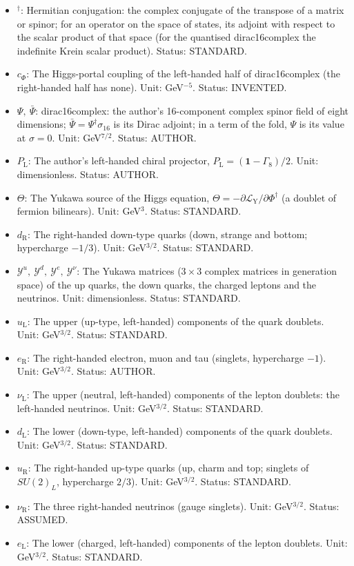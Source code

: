 \documentclass[
  10pt,
]{article}
\begin{document}
\begin{itemize}
\item
  \({}^\dagger\): Hermitian conjugation: the complex conjugate of the
  transpose of a matrix or spinor; for an operator on the space of
  states, its adjoint with respect to the scalar product of that space
  (for the quantised dirac16complex the indefinite Krein scalar
  product). Status: STANDARD.
\item
  \(c_\Phi\): The Higgs-portal coupling of the left-handed half of
  dirac16complex (the right-handed half has none). Unit: GeV\(^{-5}\).
  Status: INVENTED.
\item
  \(\Psi,\ \bar\Psi\): dirac16complex: the author's 16-component complex
  spinor field of eight dimensions;
  \(\bar\Psi = \Psi^\dagger\sigma_{16}\) is its Dirac adjoint; in a term
  of the fold, \(\Psi\) is its value at \(\sigma = 0\). Unit:
  GeV\(^{7/2}\). Status: AUTHOR.
\item
  \(P_{\mathrm{L}}\): The author's left-handed chiral projector,
  \(P_{\mathrm{L}} = (\mathbf{1} - \Gamma_8)/2\). Unit: dimensionless.
  Status: AUTHOR.
\item
  \(\Theta\): The Yukawa source of the Higgs equation,
  \(\Theta = -\partial\mathcal{L}_{\mathrm{Y}}/\partial\Phi^\dagger\) (a
  doublet of fermion bilinears). Unit: GeV\(^3\). Status: STANDARD.
\item
  \(d_{\mathrm{R}}\): The right-handed down-type quarks (down, strange
  and bottom; hypercharge \(-1/3\)). Unit: GeV\(^{3/2}\). Status:
  STANDARD.
\item
  \(\mathcal{Y}^{u},\ \mathcal{Y}^{d},\ \mathcal{Y}^{e},\ \mathcal{Y}^{\nu}\):
  The Yukawa matrices (\(3 \times 3\) complex matrices in generation
  space) of the up quarks, the down quarks, the charged leptons and the
  neutrinos. Unit: dimensionless. Status: STANDARD.
\item
  \(u_{\mathrm{L}}\): The upper (up-type, left-handed) components of the
  quark doublets. Unit: GeV\(^{3/2}\). Status: STANDARD.
\item
  \(e_{\mathrm{R}}\): The right-handed electron, muon and tau (singlets,
  hypercharge \(-1\)). Unit: GeV\(^{3/2}\). Status: AUTHOR.
\item
  \(\nu_{\mathrm{L}}\): The upper (neutral, left-handed) components of
  the lepton doublets: the left-handed neutrinos. Unit: GeV\(^{3/2}\).
  Status: STANDARD.
\item
  \(d_{\mathrm{L}}\): The lower (down-type, left-handed) components of
  the quark doublets. Unit: GeV\(^{3/2}\). Status: STANDARD.
\item
  \(u_{\mathrm{R}}\): The right-handed up-type quarks (up, charm and
  top; singlets of \(SU(2)_L\), hypercharge \(2/3\)). Unit:
  GeV\(^{3/2}\). Status: STANDARD.
\item
  \(\nu_{\mathrm{R}}\): The three right-handed neutrinos (gauge
  singlets). Unit: GeV\(^{3/2}\). Status: ASSUMED.
\item
  \(e_{\mathrm{L}}\): The lower (charged, left-handed) components of the
  lepton doublets. Unit: GeV\(^{3/2}\). Status: STANDARD.
\end{itemize}
\end{document}
